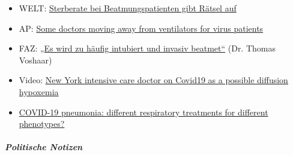 \begin{itemize}
\tightlist
\item
  WELT:
  \href{https://www.welt.de/vermischtes/article207221877/Corona-Pandemie-Sterberate-bei-Beatmungspatienten-gibt-Raetsel-auf.html}{Sterberate
  bei Beatmungspatienten gibt Rätsel auf}
\item
  AP: \href{https://apnews.com/8ccd325c2be9bf454c2128dcb7bd616d}{Some
  doctors moving away from ventilators for virus patients}
\item
  FAZ:
  \href{https://www.vpneumo.de/fileadmin/pdf/f2004071.007_Voshaar.pdf}{„Es
  wird zu häufig intubiert und invasiv beatmet``} (Dr. Thomas Voshaar)
\item
  Video: \href{https://www.youtube.com/watch?v=NmRlvX3VrAQ}{New York
  intensive care doctor on Covid19 as a possible diffusion hypoxemia}
\item
  \href{https://link.springer.com/article/10.1007/s00134-020-06033-2}{COVID-19
  pneumonia: different respiratory treatments for different phenotypes?}
\end{itemize}

\hypertarget{politische-notizen}{%
\subparagraph{\texorpdfstring{\textbf{Politische
Notizen}}{Politische Notizen}}\label{politische-notizen}}

